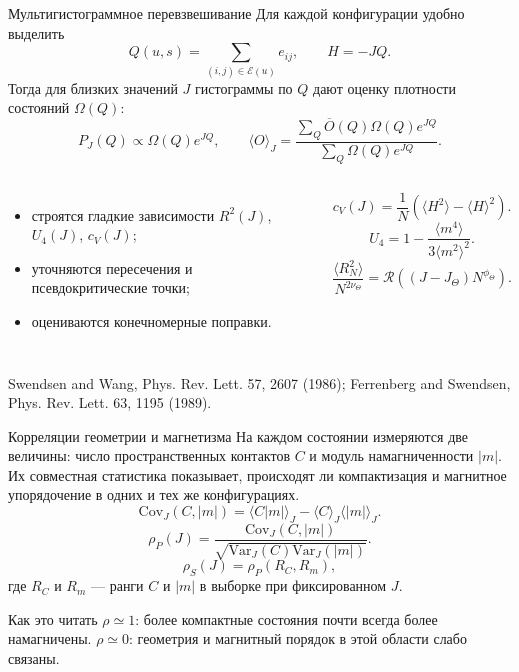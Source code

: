 \documentclass[t,aspectratio=169]{beamer}
\newcommand{\E}{\mathcal E}
\newcommand{\R}{\mathcal R}
\newcommand{\source}[1]{\vfill{\tiny\raggedright #1\par}}
\begin{document}
\begin{frame}{Мультигистограммное перевзвешивание}
  \small
  Для каждой конфигурации удобно выделить
  \[
    Q(u,s)=\sum_{(i,j)\in\E(u)}e_{ij},\qquad H=-JQ.
  \]
  Тогда для близких значений \(J\) гистограммы по \(Q\) дают оценку плотности состояний \(\Omega(Q)\):
  \[
    P_J(Q)\propto \Omega(Q)e^{JQ},
    \qquad
    \langle O\rangle_J=
    \frac{\sum_Q \overline O(Q)\Omega(Q)e^{JQ}}
    {\sum_Q \Omega(Q)e^{JQ}}.
  \]
  \begin{columns}[T,onlytextwidth]
    \begin{itemize}
      \item строятся гладкие зависимости \(R^2(J)\), \(U_4(J)\), \(c_V(J)\);
      \item уточняются пересечения и псевдокритические точки;
      \item оцениваются конечномерные поправки.
    \end{itemize}
    \[
      c_V(J)=\frac{1}{N}\left(\langle H^2\rangle-\langle H\rangle^2\right).
    \]
    \[
      U_4=1-\frac{\langle m^4\rangle}{3\langle m^2\rangle^2}.
    \]
    \[
      \frac{\langle R_N^2\rangle}{N^{2\nu_\Theta}}
      =
      \R\!\left((J-J_\Theta)N^{\phi_\Theta}\right).
    \]
  \end{columns}
  \source{Swendsen and Wang, Phys. Rev. Lett. 57, 2607 (1986); Ferrenberg and Swendsen, Phys. Rev. Lett. 63, 1195 (1989).}
\end{frame}

\begin{frame}{Корреляции геометрии и магнетизма}
  \small
  На каждом состоянии измеряются две величины: число пространственных контактов \(C\) и модуль намагниченности \(|m|\). Их совместная статистика показывает, происходят ли компактизация и магнитное упорядочение в одних и тех же конфигурациях.
  \[
    \mathrm{Cov}_J(C,|m|)
    =
    \langle C|m|\rangle_J-\langle C\rangle_J\langle |m|\rangle_J .
  \]
  \[
    \rho_P(J)=
    \frac{\mathrm{Cov}_J(C,|m|)}
    {\sqrt{\mathrm{Var}_J(C)\mathrm{Var}_J(|m|)}}.
  \]
  \[
    \rho_S(J)=\rho_P(R_C,R_m),
  \]
  где \(R_C\) и \(R_m\) --- ранги \(C\) и \(|m|\) в выборке при фиксированном \(J\).
  \begin{block}{Как это читать}
    \(\rho\simeq1\): более компактные состояния почти всегда более намагничены. \(\rho\simeq0\): геометрия и магнитный порядок в этой области слабо связаны.
  \end{block}
\end{frame}
\end{document}
